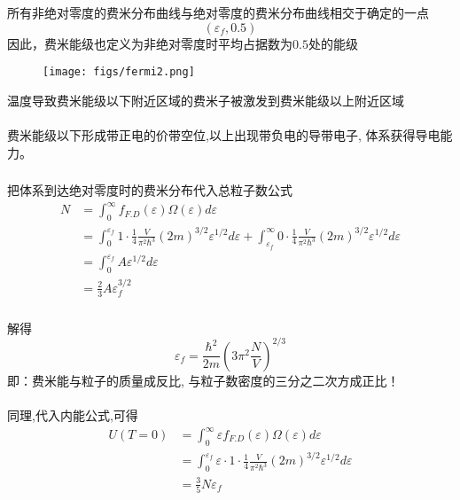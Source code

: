 \begin{frame}
  \frametitle{}
\begin{minipage}[b]{0.49\textwidth}
所有非绝对零度的费米分布曲线与绝对零度的费米分布曲线相交于确定的一点
\[ (\varepsilon_f, 0.5)\]
因此，费米能级也定义为非绝对零度时平均占据数为$0.5$处的能级 \\
\end{minipage}
\begin{minipage}[b]{0.49\textwidth}
  \begin{figure}
    \texttt{[image: figs/fermi2.png]}   
\end{figure}
\end{minipage}
温度导致费米能级以下附近区域的费米子被激发到费米能级以上附近区域 \\
~~\\ 
费米能级以下形成带正电的价带空位,以上出现带负电的导带电子, 体系获得导电能力。 
\end{frame} 

\begin{frame}[label=current]
  \frametitle{}
\证 把体系到达绝对零度时的费米分布代入总粒子数公式
\[ 
  \begin{aligned}
  N&= \int_0^\infty f_{F.D}(\varepsilon) \Omega(\varepsilon) d \varepsilon \\ 
  &= \int_0^{\varepsilon _f} 1\cdot \frac{1}{4} \frac{V}{\pi ^2 \hbar^3} (2m)^{3/2} \varepsilon^{1/2} d \varepsilon + \int_{\varepsilon _f}^\infty 0\cdot \frac{1}{4} \frac{V}{\pi ^2 \hbar^3} (2m)^{3/2} \varepsilon^{1/2} d \varepsilon \\
  &= \int_0^{\varepsilon _f} A \varepsilon^{1/2} d \varepsilon \\
  &= \frac{2}{3} A \varepsilon _f^{3/2}
  \end{aligned}\]
\end{frame} 

\begin{frame}[label=current]
  \frametitle{}
解得
\[ \varepsilon _f = \frac{\hbar^2}{2m} \left(3\pi ^2 \frac{N}{V}\right)^{2/3}\]
即：费米能与粒子的质量成反比, 与粒子数密度的三分之二次方成正比！ \\
~~\\ 
同理,代入内能公式,可得
\[ 
  \begin{aligned}
  U(T=0) &= \int_0^\infty \varepsilon f_{F.D}(\varepsilon) \Omega(\varepsilon) d \varepsilon \\ 
  &= \int_0^{\varepsilon _f}  \varepsilon \cdot 1\cdot \frac{1}{4} \frac{V}{\pi ^2 \hbar^3} (2m)^{3/2} \varepsilon^{1/2} d \varepsilon \\
  &= \frac{3}{5} N \varepsilon _f 
  \end{aligned}\]
\end{frame} 

